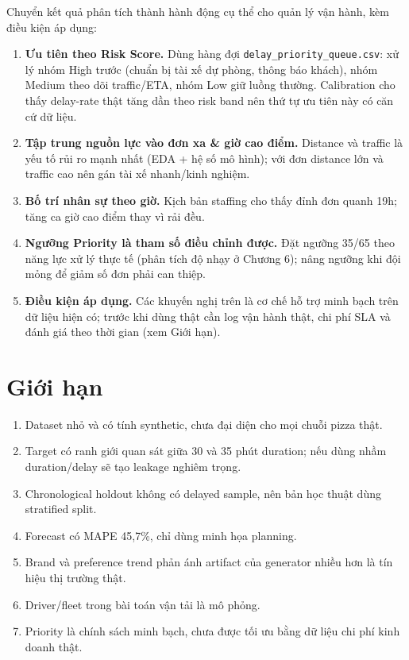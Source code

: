 \documentclass[12pt,a4paper,oneside]{report}
\newcommand{\code}[1]{\nolinkurl{#1}}
\begin{document}
Chuyển kết quả phân tích thành hành động cụ thể cho quản lý vận hành, kèm điều
kiện áp dụng:

\begin{enumerate}[leftmargin=*]
  \item \textbf{Ưu tiên theo Risk Score.} Dùng hàng đợi
        \code{delay\_priority\_queue.csv}: xử lý nhóm High trước (chuẩn bị tài
        xế dự phòng, thông báo khách), nhóm Medium theo dõi traffic/ETA, nhóm
        Low giữ luồng thường. Calibration cho thấy delay-rate thật tăng dần theo
        risk band nên thứ tự ưu tiên này có căn cứ dữ liệu.
  \item \textbf{Tập trung nguồn lực vào đơn xa \& giờ cao điểm.} Distance và
        traffic là yếu tố rủi ro mạnh nhất (EDA + hệ số mô hình); với đơn
        distance lớn và traffic cao nên gán tài xế nhanh/kinh nghiệm.
  \item \textbf{Bố trí nhân sự theo giờ.} Kịch bản staffing cho thấy đỉnh đơn
        quanh 19h; tăng ca giờ cao điểm thay vì rải đều.
  \item \textbf{Ngưỡng Priority là tham số điều chỉnh được.} Đặt ngưỡng 35/65
        theo năng lực xử lý thực tế (phân tích độ nhạy ở Chương 6); nâng ngưỡng
        khi đội mỏng để giảm số đơn phải can thiệp.
  \item \textbf{Điều kiện áp dụng.} Các khuyến nghị trên là cơ chế hỗ trợ minh
        bạch trên dữ liệu hiện có; trước khi dùng thật cần log vận hành thật,
        chi phí SLA và đánh giá theo thời gian (xem Giới hạn).
\end{enumerate}

\section{Giới hạn}

\begin{enumerate}[leftmargin=*]
  \item Dataset nhỏ và có tính synthetic, chưa đại diện cho mọi chuỗi pizza thật.
  \item Target có ranh giới quan sát giữa 30 và 35 phút duration; nếu dùng nhầm
        duration/delay sẽ tạo leakage nghiêm trọng.
  \item Chronological holdout không có delayed sample, nên bản học thuật dùng
        stratified split.
  \item Forecast có MAPE 45,7\%, chỉ dùng minh họa planning.
  \item Brand và preference trend phản ánh artifact của generator nhiều hơn là
        tín hiệu thị trường thật.
  \item Driver/fleet trong bài toán vận tải là mô phỏng.
  \item Priority là chính sách minh bạch, chưa được tối ưu bằng dữ liệu chi phí
        kinh doanh thật.
\end{enumerate}
\end{document}
